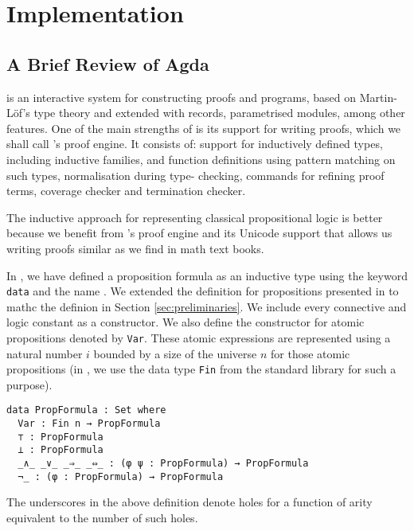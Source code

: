 \documentclass[../main.tex]{subfiles}
\begin{document}

\section{Implementation}
\label{sec:implementation}


\subsection{A Brief Review of Agda}
\label{ssec:agda-definition}

\Agda is an interactive system for constructing proofs and programs,
based on Martin-L\"{o}f's type theory and extended with records,
parametrised modules, among other features. One of the main
strengths of \Agda is its support for writing proofs, which we shall
call \Agda's proof engine. It consists of: support for inductively
defined types, including inductive families, and function
definitions using pattern matching on such types, normalisation
during type- checking, commands for refining proof terms, coverage
checker and termination checker.

The inductive approach for representing classical propositional
logic is better because we benefit from \Agda's proof engine and its
Unicode support that allows us writing proofs similar as we find in
math text books.

In \Agda, we have defined a proposition formula
as an inductive type using the keyword \texttt{data} and the name
.
We extended the definition for propositions presented in
\cite{Altenkirch2015} to mathc the definion in Section
\ref{sec:preliminaries}.
We include every connective and logic constant as a constructor.
We also define the constructor for atomic propositions denoted by
\verb!Var!. These atomic expressions are represented using a natural
number $i$ bounded by a size of the universe $n$ for those atomic
propositions (in \Agda, we use the data type \verb!Fin! from the
standard  library for such a purpose).

\begin{verbatim}
data PropFormula : Set where
  Var : Fin n → PropFormula
  ⊤ : PropFormula
  ⊥ : PropFormula
  _∧_ _∨_ _⇒_ _⇔_ : (φ ψ : PropFormula) → PropFormula
  ¬_ : (φ : PropFormula) → PropFormula
\end{verbatim}

\begin{myremark}
The underscores in the above definition denote holes for a function of arity equivalent to the number of such holes.
\end{myremark}
\end{document}
